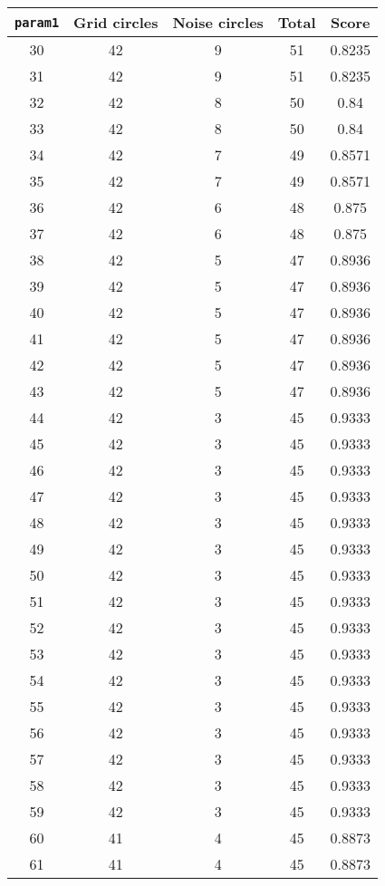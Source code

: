 \documentclass[letterpaper, 12pt]{article}
\begin{document}
\begin{longtable}{|c|c|c|c|c|}
\hline
\textbf{\texttt{param1}} & \textbf{Grid circles} & \textbf{Noise circles} & \textbf{Total} & \textbf{Score} \\
\hline
30 & 42 & 9 & 51 & 0.8235 \\
\hline
31 & 42 & 9 & 51 & 0.8235 \\
\hline
32 & 42 & 8 & 50 & 0.84 \\
\hline
33 & 42 & 8 & 50 & 0.84 \\
\hline
34 & 42 & 7 & 49 & 0.8571 \\
\hline
35 & 42 & 7 & 49 & 0.8571 \\
\hline
36 & 42 & 6 & 48 & 0.875 \\
\hline
37 & 42 & 6 & 48 & 0.875 \\
\hline
38 & 42 & 5 & 47 & 0.8936 \\
\hline
39 & 42 & 5 & 47 & 0.8936 \\
\hline
40 & 42 & 5 & 47 & 0.8936 \\
\hline
41 & 42 & 5 & 47 & 0.8936 \\
\hline
42 & 42 & 5 & 47 & 0.8936 \\
\hline
43 & 42 & 5 & 47 & 0.8936 \\
\hline
44 & 42 & 3 & 45 & 0.9333 \\
\hline
45 & 42 & 3 & 45 & 0.9333 \\
\hline
46 & 42 & 3 & 45 & 0.9333 \\
\hline
47 & 42 & 3 & 45 & 0.9333 \\
\hline
48 & 42 & 3 & 45 & 0.9333 \\
\hline
49 & 42 & 3 & 45 & 0.9333 \\
\hline
50 & 42 & 3 & 45 & 0.9333 \\
\hline
51 & 42 & 3 & 45 & 0.9333 \\
\hline
52 & 42 & 3 & 45 & 0.9333 \\
\hline
53 & 42 & 3 & 45 & 0.9333 \\
\hline
54 & 42 & 3 & 45 & 0.9333 \\
\hline
55 & 42 & 3 & 45 & 0.9333 \\
\hline
56 & 42 & 3 & 45 & 0.9333 \\
\hline
57 & 42 & 3 & 45 & 0.9333 \\
\hline
58 & 42 & 3 & 45 & 0.9333 \\
\hline
59 & 42 & 3 & 45 & 0.9333 \\
\hline
60 & 41 & 4 & 45 & 0.8873 \\
\hline
61 & 41 & 4 & 45 & 0.8873 \\

\end{longtable}
\end{document}
